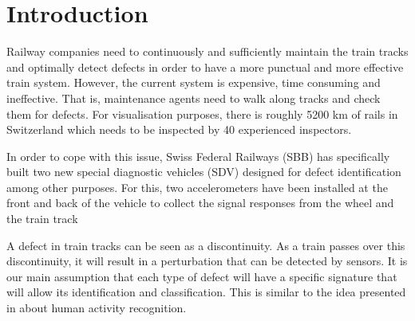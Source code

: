 



%



\maketitle

%
{
  \hypersetup{linkcolor=black}
  \tableofcontents
   
}
\newpage
\chapter{Introduction}
Railway companies need to continuously and sufficiently maintain the train tracks and optimally detect defects in order to have a more punctual and more effective train system. However, the current system is expensive, time consuming and ineffective. That is, maintenance agents need to walk along tracks and check them for defects. For visualisation purposes, there is roughly 5200 km of rails in Switzerland which needs to be inspected by 40 experienced inspectors.


In order to cope with this issue, Swiss Federal Railways (SBB) has specifically built two new special diagnostic vehicles (SDV) designed for defect identification among other purposes. For this, two accelerometers have been installed at the front and back of the vehicle to collect the signal responses from the wheel and the train track

A defect in train tracks can be seen as a discontinuity. As a train passes over this discontinuity, it will result in a perturbation that can be detected by sensors. It is our main assumption that each type of defect will have a specific signature that will allow its identification and classification. This is similar to the idea presented in \cite{Introduc31:online} about human activity recognition.

